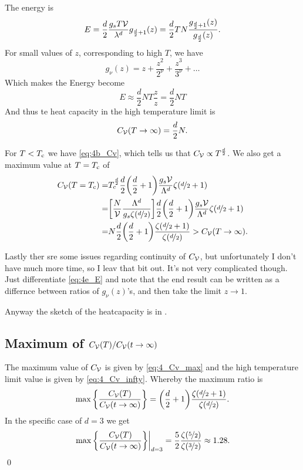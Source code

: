 \documentclass[11pt,letter, swedish, english
]{article}
\begin{document}
The energy is 
\begin{equation}\label{eq:4e_E}
E=\frac{d}{2}\frac{g_sT\mathcal{V}}{\lambda^d}g_{\frac{d}{2}+1}(z)
=\frac{d}{2}TN\frac{g_{\frac{d}{2}+1}(z)}{g_{\frac{d}{2}}(z)}.
\end{equation}
For small values of $z$, corresponding to high
$T$, we have
\begin{equation}
g_\nu(z)=z+\frac{z^2}{2^\nu}+\frac{z^3}{3^\nu}+\ldots
\end{equation}
Which makes the Energy become
\begin{equation}
E\approx 
\frac{d}{2}NT\frac{z}{z}
= \frac{d}{2}NT
\end{equation}
And thus te heat capacity in the high temperature limit is
\begin{equation}\label{eq:4_Cv_infty}
C_{\mathcal{V}}(T\to\infty)=\frac{d}{2}N.
\end{equation}

For $T<T_{\text{c}}$ we have \eqref{eq:4b_Cv}, which tells us that 
$C_{\mathcal{V}}\propto T^{\frac{d}{2}}$. We also get a maximum value at $T=T_{\text{c}}$ of
\begin{equation}
\begin{aligned}\label{eq:4_Cv_max}
C_{\mathcal{V}}(T=T_{\text{c}})=&
T_c^{\frac{d}{2}}\frac{d}{2}\qty(\frac{d}{2}+1)\frac{g_s\mathcal{V}}{\Lambda^d}\zeta(\nicefrac{d}{2}+1)\\
=&\qty[\frac{N}{\mathcal{V}}\frac{\Lambda^d}{g_s\zeta(\nicefrac{d}{2})}]
\frac{d}{2}\qty(\frac{d}{2}+1)\frac{g_s\mathcal{V}}{\Lambda^d}\zeta(\nicefrac{d}{2}+1)\\
=&N\frac{d}{2}\qty(\frac{d}{2}+1)
\frac{\zeta(\nicefrac{d}{2}+1)}{\zeta(\nicefrac{d}{2})}>C_{\mathcal{V}}(T\to\infty).
\\
\end{aligned}
\end{equation}

Lastly ther sre some issues regarding continuity of $C_{\mathcal{V}}$, but
unfortunately I don't have much more time, so I leav that bit
out. It's not very complicated though. Just differentiate
\eqref{eq:4e_E} and note that the end result can be written as a
differnce between ratios of $g_\nu(z)$'s, and then take the limit
$z\to1$. 

Anyway the sketch of the heatcapacity is in .

\subsection{Maximum of $C_{\mathcal{V}}(T)/C_{\mathcal{V}}(t\to\infty)$}
The maximum value of $C_{\mathcal{V}}$ is given by \eqref{eq:4_Cv_max} and the
high temperature limit value is given by
\eqref{eq:4_Cv_infty}. Whereby the maximum ratio is
\begin{equation}
\max\qty{\frac{C_{\ensuremath{\mathcal{V}}}(T)}{C_{\ensuremath{\mathcal{V}}}(t\to\infty)}}=
\qty(\frac{d}{2}+1)\frac{\zeta(\nicefrac{d}{2}+1)}{\zeta(\nicefrac{d}{2})}.
\end{equation}
In the specific case of $d=3$ we get 
\begin{equation}
\eval{\max\qty{\frac{C_\V(T)}{C_\V(t\to\infty)}}}_{d=3}=
\frac{5}{2}\frac{\zeta(\nicefrac{5}{2})}{\zeta(\nicefrac{3}{2})}
\approx 1.28.
\end{equation}
\qed
\end{document}

